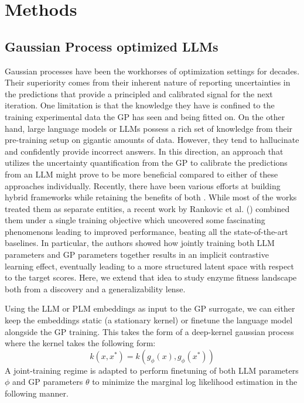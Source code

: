 \documentclass{article}
\theoremstyle{plain}
\theoremstyle{definition}
\theoremstyle{remark}
\begin{document}
\section{Methods}
\subsection{Gaussian Process optimized LLMs}
Gaussian processes have been the workhorses of optimization settings for decades. Their superiority comes from their inherent nature of reporting uncertainties in the predictions that provide a principled and calibrated signal for the next iteration. One limitation is that the knowledge they have is confined to the training experimental data the GP has  seen and being fitted on. On the other hand, large language models or LLMs possess a rich set of knowledge from their pre-training setup on gigantic amounts of data. However, they tend to hallucinate and confidently provide incorrect answers. In this direction, an approach that utilizes the uncertainty quantification from the GP to calibrate the predictions from an LLM might prove to be more beneficial compared to either of these approaches individually. Recently, there have been various efforts at building hybrid frameworks while retaining the benefits of both \cite{ramos2023bayesian, rankovic2023bochemian}. While most of the works treated them as separate entities, a recent work by Rankovic et al. (\citeyear{rankovic2025gollum}) combined them under a single training objective which uncovered some fascinating phenomenons leading to improved performance, beating all the state-of-the-art baselines.  In particular, the authors showed how jointly training both LLM parameters and GP parameters together results in an implicit contrastive learning effect, eventually leading to a more structured latent space with respect to the target scores. Here, we extend that idea to study enzyme fitness landscape both from a discovery and a generalizability lense.

Using the LLM or PLM embeddings as input to the GP surrogate, we can either keep the embeddings static (a stationary kernel) or finetune the language model alongside the GP training. This takes the form of a deep-kernel gaussian process where the kernel takes the following form:
\begin{equation}
    k(x, x^*) = k(g_{\phi}(x), g_{\phi}(x^*))
\end{equation}
A joint-training regime is adapted to perform finetuning of both LLM parameters $\phi$ and GP parameters $\theta$ to minimize the marginal log likelihood estimation in the following manner. 
\end{document}
